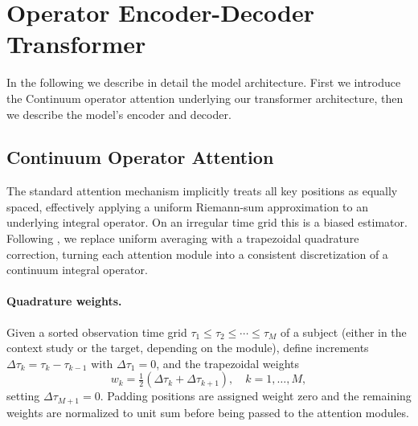 




\section{Operator Encoder-Decoder Transformer}
\label{app:architecture}

\newcommand{\btau}{\boldsymbol{\tau}}
\newcommand{\bY}{\mathbf{Y}}
\newcommand{\bz}{\boldsymbol{z}}

In the following we describe in detail the model architecture. First we introduce the Continuum operator attention underlying our transformer architecture, then we describe the model's encoder and decoder.

\subsection{Continuum Operator Attention}
\label{app:op_attn}

The standard attention mechanism implicitly treats all key positions as
equally spaced, effectively applying a uniform Riemann-sum approximation to an
underlying integral operator. On an irregular time grid this is a biased estimator.
Following \citet{calvello2024continuum}, we replace uniform averaging with a trapezoidal quadrature correction, turning each attention module into a consistent discretization of a continuum integral operator.

\paragraph{Quadrature weights.}
Given a sorted observation time grid $\tau_1 \le \tau_2 \le \cdots \le \tau_M$ of a subject (either in the context study or the target, depending on the module), define
increments $\Delta\tau_k = \tau_k - \tau_{k-1}$ with $\Delta\tau_1 = 0$,
and the trapezoidal weights
\begin{equation}
    w_k = \tfrac{1}{2}\left(\Delta\tau_k + \Delta\tau_{k+1}\right),
    \quad k = 1, \ldots, M,
    \label{eq:trap_weights}
\end{equation}
setting $\Delta\tau_{M+1} = 0$.
Padding positions are assigned weight zero and the remaining weights are
normalized to unit sum before being passed to the attention modules.

